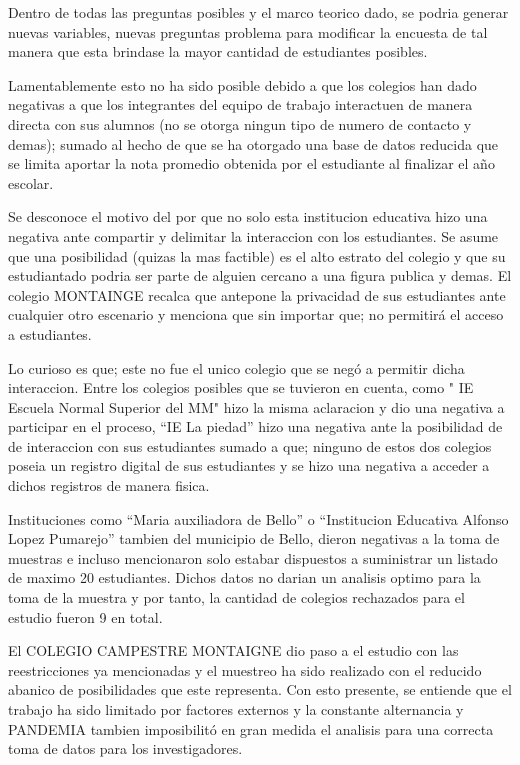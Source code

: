 \documentclass[
]{article}
\begin{document}
Dentro de todas las preguntas posibles y el marco teorico dado, se
podria generar nuevas variables, nuevas preguntas problema para
modificar la encuesta de tal manera que esta brindase la mayor cantidad
de estudiantes posibles.

Lamentablemente esto no ha sido posible debido a que los colegios han
dado negativas a que los integrantes del equipo de trabajo interactuen
de manera directa con sus alumnos (no se otorga ningun tipo de numero de
contacto y demas); sumado al hecho de que se ha otorgado una base de
datos reducida que se limita aportar la nota promedio obtenida por el
estudiante al finalizar el año escolar.

Se desconoce el motivo del por que no solo esta institucion educativa
hizo una negativa ante compartir y delimitar la interaccion con los
estudiantes. Se asume que una posibilidad (quizas la mas factible) es el
alto estrato del colegio y que su estudiantado podria ser parte de
alguien cercano a una figura publica y demas. El colegio MONTAINGE
recalca que antepone la privacidad de sus estudiantes ante cualquier
otro escenario y menciona que sin importar que; no permitirá el acceso a
estudiantes.

Lo curioso es que; este no fue el unico colegio que se negó a permitir
dicha interaccion. Entre los colegios posibles que se tuvieron en
cuenta, como " IE Escuela Normal Superior del MM" hizo la misma
aclaracion y dio una negativa a participar en el proceso, ``IE La
piedad'' hizo una negativa ante la posibilidad de de interaccion con sus
estudiantes sumado a que; ninguno de estos dos colegios poseia un
registro digital de sus estudiantes y se hizo una negativa a acceder a
dichos registros de manera fisica.

Instituciones como ``Maria auxiliadora de Bello'' o ``Institucion
Educativa Alfonso Lopez Pumarejo'' tambien del municipio de Bello,
dieron negativas a la toma de muestras e incluso mencionaron solo
estabar dispuestos a suministrar un listado de maximo 20 estudiantes.
Dichos datos no darian un analisis optimo para la toma de la muestra y
por tanto, la cantidad de colegios rechazados para el estudio fueron 9
en total.

El COLEGIO CAMPESTRE MONTAIGNE dio paso a el estudio con las
reestricciones ya mencionadas y el muestreo ha sido realizado con el
reducido abanico de posibilidades que este representa. Con esto
presente, se entiende que el trabajo ha sido limitado por factores
externos y la constante alternancia y PANDEMIA tambien imposibilitó en
gran medida el analisis para una correcta toma de datos para los
investigadores.
\end{document}
